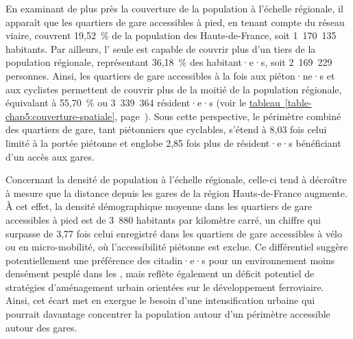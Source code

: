 \begin{refsegment}
En examinant de plus près la couverture de la population à l'échelle régionale, il apparaît que les quartiers de gare accessibles à pied, en tenant compte du réseau viaire, couvrent 19,52~\% de la population des Hauts-de-France, soit 1~170~135 habitants. Par ailleurs, l' seule est capable de couvrir plus d'un tiers de la population régionale, représentant 36,18~\% des habitant·e·s, soit 2~169~229 personnes. Ainsi, les quartiers de gare accessibles à la fois aux piéton·ne·s et aux cyclistes permettent de couvrir plus de la moitié de la population régionale, équivalant à 55,70~\% ou 3~339~364 résident·e·s (voir le \hyperref[table-chap5:couverture-spatiale]{tableau~\ref{table-chap5:couverture-spatiale}}, page~\pageref{table-chap5:couverture-spatiale}). Sous cette perspective, le périmètre combiné des quartiers de gare, tant piétonniers que cyclables, s'étend à 8,03 fois celui limité à la portée piétonne et englobe 2,85 fois plus de résident·e·s bénéficiant d'un accès aux gares.%


Concernant la densité de population à l'échelle régionale, celle-ci tend à décroître à mesure que la distance depuis les gares de la région Hauts-de-France augmente. À cet effet, la densité démographique moyenne dans les quartiers de gare accessibles à pied est de 3~880 habitants par kilomètre carré, un chiffre qui surpasse de 3,77 fois celui enregistré dans les quartiers de gare accessibles à vélo ou en micro-mobilité, où l'accessibilité piétonne est exclue. Ce différentiel suggère potentiellement une préférence des citadin·e·s pour un environnement moins densément peuplé dans les , mais reflète également un déficit potentiel de stratégies d'aménagement urbain orientées sur le développement ferroviaire. Ainsi, cet écart met en exergue le besoin d'une intensification urbaine qui pourrait davantage concentrer la population autour d'un périmètre accessible autour des gares.%


\end{refsegment}
